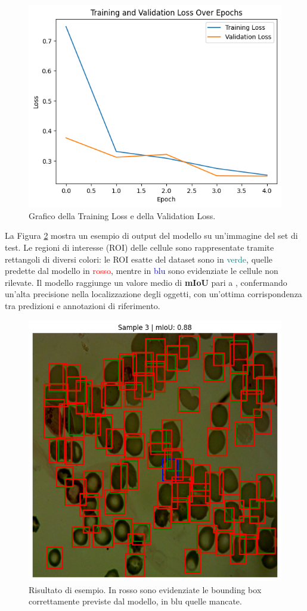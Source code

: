 \documentclass[minted, draw]{../tex/hebdomon}
\begin{document}
\begin{figure}[H]
  \centering
  \includegraphics[width=.6\linewidth]{figures/loss.png}
  \caption{Grafico della Training Loss e della Validation Loss.}
  \label{fig:loss_curve}
\end{figure}
%

La Figura \ref{fig:detection_example} mostra un esempio di output del modello su un’immagine del set di test. Le regioni di interesse (ROI) delle cellule sono rappresentate tramite rettangoli di diversi colori: le ROI esatte del dataset sono in \textcolor{teal}{verde}, quelle predette dal modello in \textcolor{red}{rosso}, mentre in \textcolor{blue}{blu} sono evidenziate le cellule non rilevate. Il modello raggiunge un valore medio di \textbf{mIoU} pari a , confermando un’alta precisione nella localizzazione degli oggetti, con un’ottima corrispondenza tra predizioni e annotazioni di riferimento.
\begin{figure}[H]
  \centering
  \includegraphics[width=.6\linewidth]{figures/ex_result.png}
  \caption{Risultato di esempio. In rosso sono evidenziate le bounding box correttamente previste dal modello, in blu quelle mancate.}
  \label{fig:detection_example}
\end{figure}
%
\end{document}
